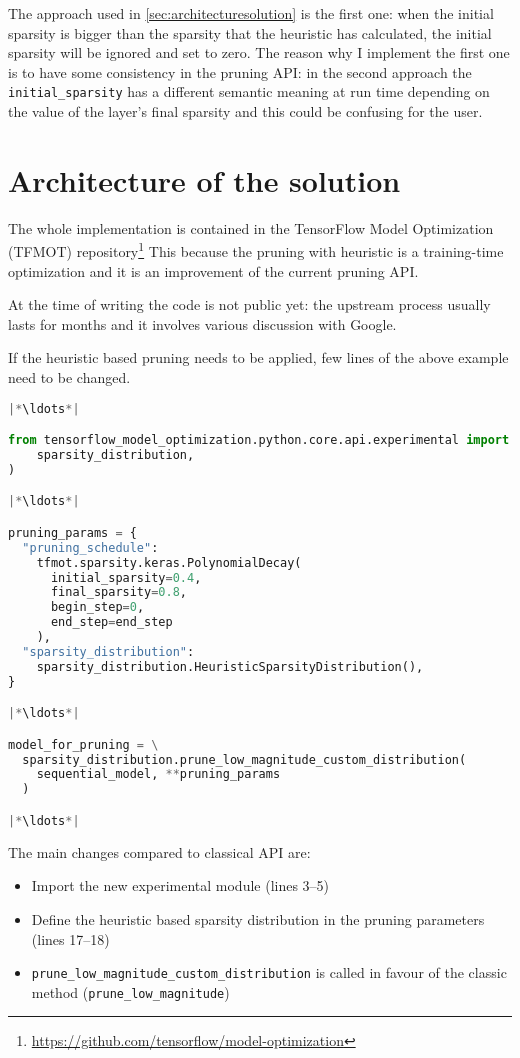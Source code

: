 The approach used in \autoref{sec:architecturesolution} is the first one: when
the initial sparsity is bigger than the sparsity that the heuristic has
calculated, the initial sparsity will be ignored and set to zero.
The reason why I implement the first one is to have some consistency in the
pruning API\@: in the second approach the \texttt{initial\_sparsity} has a
different semantic meaning at run time depending on the value of the layer's
final sparsity and this could be confusing for the user.

\section{Architecture of the solution}\label{sec:architecturesolution}
The whole implementation is contained in the TensorFlow Model Optimization
(TFMOT)
repository\footnote{\url{https://github.com/tensorflow/model-optimization}}
This because the pruning with heuristic is a training-time optimization and it
is an improvement of the current pruning API\@.

At the time of writing the code is not public yet: the upstream process usually
lasts for months and it involves various discussion with Google.

If the heuristic based pruning needs to be applied, few lines of the above
example need to be changed.

\begin{lstlisting}[language=Python, caption=Pruning with Heuristic]
|*\ldots*|

from tensorflow_model_optimization.python.core.api.experimental import (
    sparsity_distribution,
)

|*\ldots*|

pruning_params = {
  "pruning_schedule":
    tfmot.sparsity.keras.PolynomialDecay(
      initial_sparsity=0.4,
      final_sparsity=0.8,
      begin_step=0,
      end_step=end_step
    ),
  "sparsity_distribution":
    sparsity_distribution.HeuristicSparsityDistribution(),
}

|*\ldots*|

model_for_pruning = \
  sparsity_distribution.prune_low_magnitude_custom_distribution(
    sequential_model, **pruning_params
  )

|*\ldots*|
\end{lstlisting}

The main changes compared to classical API are:

\begin{itemize}
    \item Import the new experimental module (lines 3--5)
    \item Define the heuristic based sparsity distribution in the pruning
        parameters (lines 17--18)
    \item \texttt{prune\_low\_magnitude\_custom\_distribution} is called in
        favour of the classic method (\texttt{prune\_low\_magnitude})
\end{itemize}

